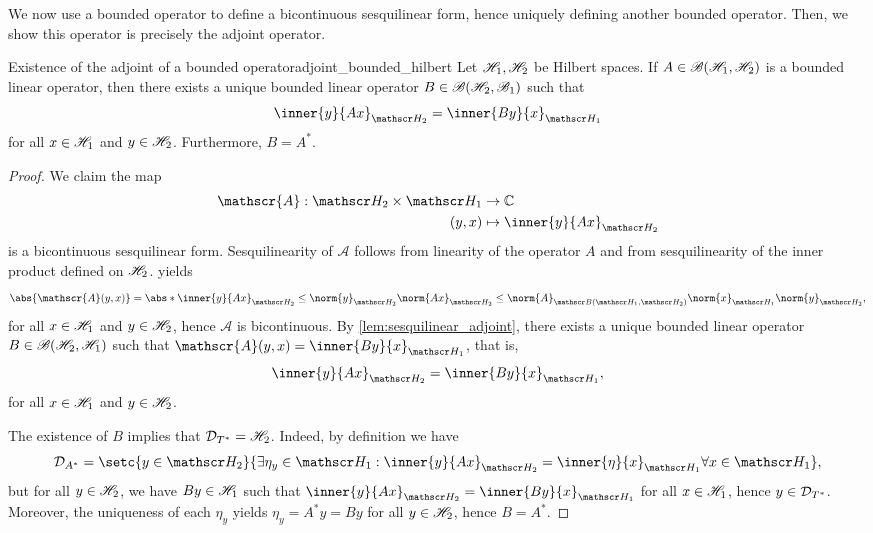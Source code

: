 We now use a bounded operator to define a bicontinuous sesquilinear form, hence uniquely defining another bounded operator. Then, we show this operator is precisely the adjoint operator.
\begin{theorem}{Existence of the adjoint of a bounded operator}{adjoint_bounded_hilbert}
    Let \(\mathscr{H}_1, \mathscr{H}_2\) be Hilbert spaces. If \(A \in \mathscr{B}(\mathscr{H}_1, \mathscr{H}_2)\) is a bounded linear operator, then there exists a unique bounded linear operator \(B \in \mathscr{B}(\mathscr{H}_2, \mathscr{B}_1)\) such that
    \begin{equation*}
        \inner{y}{Ax}_{\hilbert_2} = \inner{By}{x}_{\hilbert_1}
\end{equation*}
    for all \(x \in \mathscr{H}_1\) and \(y \in \mathscr{H}_2\). Furthermore, \(B = A^*\).
\end{theorem}
\begin{proof}
    We claim the map
    \begin{align*}
        \mathscr{A} : \hilbert_2 \times \hilbert_1 &\to \mathbb{C}\\
                                             (y,x) &\mapsto \inner{y}{Ax}_{\hilbert_2}
    \end{align*}
    is a bicontinuous sesquilinear form. Sesquilinearity of \(\mathscr{A}\) follows from linearity of the operator \(A\) and from sesquilinearity of the inner product defined on \(\mathscr{H}_2\).  yields
    \begin{equation*}
        \abs{\mathscr{A}(y,x)} = \abs*{\inner{y}{Ax}_{\hilbert_2}} \leq \norm{y}_{\hilbert_2} \norm{Ax}_{\hilbert_2} \leq \norm{A}_{\bounded(\hilbert_1, \hilbert_2)} \norm{x}_{\hilbert_1} \norm{y}_{\hilbert_2},
    \end{equation*}
    for all \(x \in \mathscr{H}_1\) and \(y \in \mathscr{H}_2\), hence \(\mathscr{A}\) is bicontinuous. By \cref{lem:sesquilinear_adjoint}, there exists a unique bounded linear operator \(B \in \mathscr{B}(\mathscr{H}_2, \mathscr{H}_1)\) such that \(\mathscr{A}(y,x) = \inner{By}{x}_{\hilbert_1}\), that is,
    \begin{equation*}
        \inner{y}{Ax}_{\hilbert_2} = \inner{By}{x}_{\hilbert_1},
    \end{equation*}
    for all \(x \in \mathscr{H}_1\) and \(y \in \mathscr{H}_2\).

    The existence of \(B\) implies that \(\mathcal{D}_{T^*} = \mathscr{H}_2\). Indeed, by definition we have
    \begin{equation*}
        \domain{A^*} = \setc{y \in \hilbert_2}{\exists \eta_y \in \hilbert_1 : \inner{y}{Ax}_{\hilbert_2} = \inner{\eta}{x}_{\hilbert_1} \forall x \in \hilbert_1},
    \end{equation*}
    but for all \(y \in \mathscr{H}_2\), we have \(By \in \mathscr{H}_1\) such that \(\inner{y}{Ax}_{\hilbert_2} = \inner{By}{x}_{\hilbert_1}\) for all \(x \in \mathscr{H}_1\), hence \(y \in \mathcal{D}_{T^*}\). Moreover, the uniqueness of each \(\eta_y\) yields \(\eta_y = A^*y = By\) for all \(y \in \mathscr{H}_2\), hence \(B = A^*\).
\end{proof}

